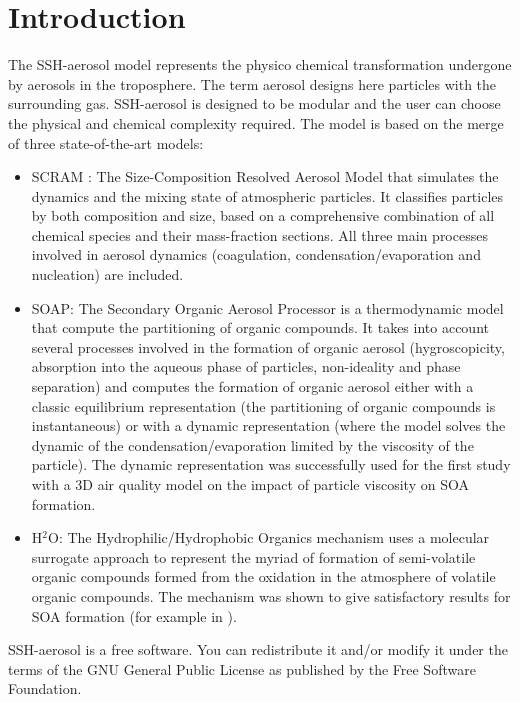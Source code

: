 \documentclass[a4paper,11pt]{article}
\begin{document}
\section{Introduction}
The SSH-aerosol model \cite{sartelet20} represents the physico chemical transformation undergone by aerosols in the troposphere. The term aerosol designs here particles with the surrounding gas. SSH-aerosol is designed to be modular and the user can choose the physical and chemical complexity required.
The model is based on the merge of three state-of-the-art models:
\begin{itemize}
\item SCRAM : The Size-Composition Resolved Aerosol Model \cite{zhu2015} that simulates the dynamics and the mixing state of atmospheric particles. It classifies particles by both composition and size, based on a comprehensive combination of all chemical species and their mass-fraction sections. All three main processes involved in aerosol dynamics (coagulation, condensation/evaporation and nucleation) are included.
\item SOAP: The Secondary Organic Aerosol Processor \cite{couvidat2015} is a thermodynamic model that compute the partitioning of organic compounds. It takes into account several processes involved in the formation of organic aerosol (hygroscopicity, absorption into the aqueous phase of particles, non-ideality and phase separation) and computes the formation of organic aerosol either with a classic equilibrium representation (the partitioning of organic compounds is instantaneous) or with a dynamic representation (where the model solves the dynamic of the condensation/evaporation limited by the viscosity of the particle). The dynamic representation was successfully used \cite{kim2019} for the first study with a 3D air quality model on the impact of particle viscosity on SOA formation.
\item H$^2$O: The Hydrophilic/Hydrophobic Organics \cite{couvidat2012} mechanism uses a molecular surrogate approach to represent the myriad of formation of semi-volatile organic compounds formed from the oxidation in the atmosphere of volatile organic compounds. The mechanism was shown to give satisfactory results for SOA formation (for example in \cite{kim2019}).
\end{itemize}

SSH-aerosol is a free software. You can redistribute it and/or modify it under the terms of the GNU General Public License as published by the Free Software Foundation.
\end{document}
